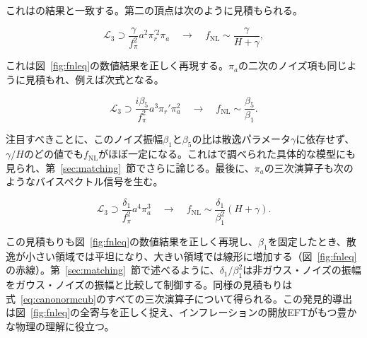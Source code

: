 \documentclass[a4paper,11pt]{ltjsarticle}
\numberwithin{equation}{section}
\def\pia{\pi_{a}}
\def\pir{\pi_{r}}
\newcommand{\Eq}[1]{Eq.~(\ref{#1})}
\newcommand{\Fig}[1]{Fig.~{\ref{#1}}}
\newcommand{\Sec}[1]{Sec.~\ref{#1}}
\renewcommand{\Eq}[1]{式~\eqref{#1}}
\renewcommand{\Fig}[1]{図~\ref{#1}}
\renewcommand{\Sec}[1]{第~\ref{#1}~節}
\begin{document}
これは\cite{LopezNacir:2011kk,Creminelli:2023aly}の結果と一致する。第二の頂点は次のように見積もられる。

\begin{equation}
    \mathcal{L}_{3} \supset \frac{\gamma}{f_{\pi}^{2}}a^2 \pir^{\prime 2}\pia \quad \rightarrow \quad f_{\text{NL}}\sim \frac{\gamma}{H+\gamma},
\end{equation}

これは\Fig{fig:fnleq}の数値結果を正しく再現する。$\pia$の二次のノイズ項も同じように見積もれ、例えば次式となる。

\begin{equation}
 \mathcal{L}_{3} \supset \frac{i\beta_{5}}{f_{\pi}^{2}}a^{3}\pir'\pia^{2} \quad \rightarrow \quad  f_{\text{NL}}\sim \frac{\beta_{5}}{\beta_{1}}.
\end{equation}

注目すべきことに、このノイズ振幅$\beta_1$と$\beta_5$の比は散逸パラメータ$\gamma$に依存せず、$\gamma/H$のどの値でも$f_{\text{NL}}$がほぼ一定になる。これは\cite{Creminelli:2023aly}で調べられた具体的な模型にも見られ、\Sec{sec:matching}でさらに論じる。最後に、$\pia$の三次演算子も次のようなバイスペクトル信号を生む。

\begin{equation}\label{eq:5thestimate}
     \mathcal{L}_{3} \supset \frac{\delta_{1}}{f_{\pi}^{2}}a^{4}\pia^{3} \quad \rightarrow \quad f_{\text{NL}}\sim \frac{\delta_{1}}{\beta^2_{1}} (H+\gamma).
 \end{equation}

この見積もりも\Fig{fig:fnleq}の数値結果を正しく再現し、$\beta_1$を固定したとき、散逸が小さい領域では平坦になり、大きい領域では線形に増加する（\Fig{fig:fnleq}の赤線）。\Sec{sec:matching}で述べるように、$\delta_1/\beta_1^2$は非ガウス・ノイズの振幅をガウス・ノイズの振幅と比較して制御する。同様の見積もりは\Eq{eq:canonormcub}のすべての三次演算子について得られる。この発見的導出は\Fig{fig:fnleq}の全寄与を正しく捉え、インフレーションの開放EFTがもつ豊かな物理の理解に役立つ。
\end{document}
